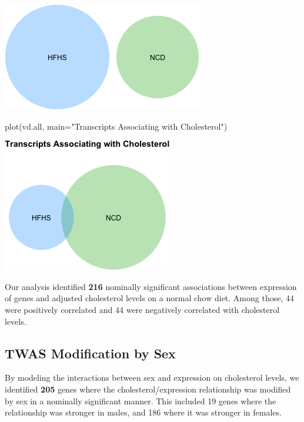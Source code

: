 \documentclass[
]{article}
\newenvironment{Shaded}{\begin{snugshade}}{\end{snugshade}}
\newcommand{\AttributeTok}[1]{\textcolor[rgb]{0.77,0.63,0.00}{#1}}
\newcommand{\FunctionTok}[1]{\textcolor[rgb]{0.00,0.00,0.00}{#1}}
\newcommand{\NormalTok}[1]{#1}
\newcommand{\StringTok}[1]{\textcolor[rgb]{0.31,0.60,0.02}{#1}}
\begin{document}
\includegraphics{figures/cholesterol-twas-hf-2.png}

\begin{Shaded}
\begin{Highlighting}[]
\FunctionTok{plot}\NormalTok{(vd.all, }\AttributeTok{main=}\StringTok{"Transcripts Associating with Cholesterol"}\NormalTok{)}
\end{Highlighting}
\end{Shaded}

\includegraphics{figures/cholesterol-twas-hf-3.png}

Our analysis identified \textbf{216} nominally significant associations
between expression of genes and adjusted cholesterol levels on a normal
chow diet. Among those, 44 were positively correlated and 44 were
negatively correlated with cholesterol levels.

\hypertarget{twas-modification-by-sex}{%
\subsection{TWAS Modification by Sex}\label{twas-modification-by-sex}}

By modeling the interactions between sex and expression on cholesterol
levels, we identified \textbf{205} genes where the
cholesterol/expression relationship was modified by sex in a nominally
significant manner. This included 19 genes where the relationship was
stronger in males, and 186 where it was stronger in females.
\end{document}
